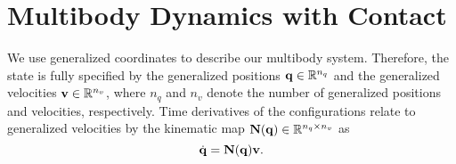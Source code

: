 
\section{Multibody Dynamics with Contact}
\label{sec:multibody_dynamics_with_contact}

We use generalized coordinates to describe our multibody system. Therefore, the
state is fully specified by the generalized positions
${\mathbf{q}}\in\mathbb{R}^{n_q}$ and the generalized velocities
${\mathbf{v}}\in\mathbb{R}^{n_v}$, where $n_q$ and $n_v$ denote the number of
generalized positions and velocities, respectively. Time derivatives of the
configurations relate to generalized velocities by the kinematic map ${\mathbf{N}}({\mathbf{q}})\in\mathbb{R}^{n_q\times
n_v}$ as
\begin{equation}
    \dot{\mf{q}}=\mf{N}(\mf{q})\mf{v}.
    \label{eq:v_to_qdot}
\end{equation}





